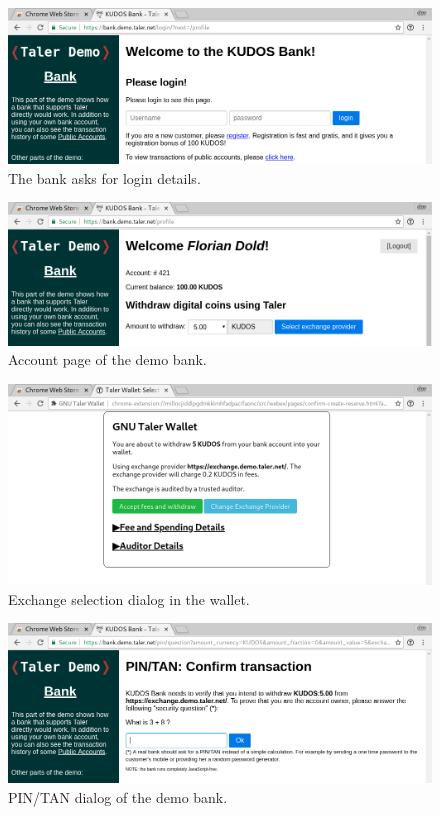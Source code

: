 \begin{figure}
\centering
\includegraphics[width=\textwidth]{taler-screenshots/bank-login.png}
\caption{The bank asks for login details.}
\label{fig:ux:bank-login}
\end{figure}

\begin{figure}
\centering
\includegraphics[width=\textwidth]{taler-screenshots/bank-profile.png}
\caption{Account page of the demo bank.}
\label{fig:ux:bank-profile}
\end{figure}

\begin{figure}
\centering
\includegraphics[width=\textwidth]{taler-screenshots/withdraw-confirm.png}
\caption{Exchange selection dialog in the wallet.}
\label{fig:ux:select-exchange}
\end{figure}

\begin{figure}
\centering
\includegraphics[width=\textwidth]{taler-screenshots/pin-tan.png}
\caption{PIN/TAN dialog of the demo bank.}
\label{fig:ux:pin-tan}
\end{figure}

